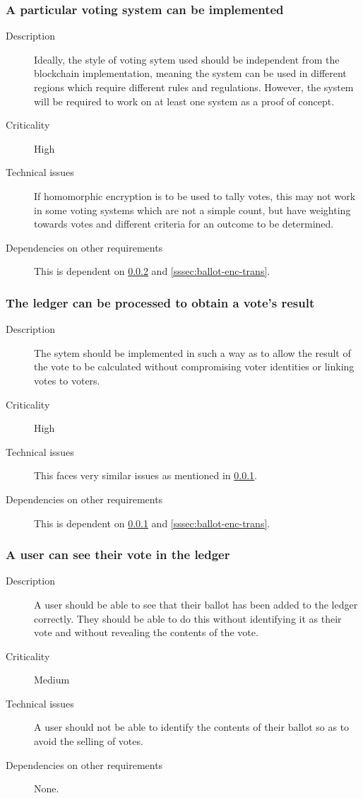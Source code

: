 \documentclass[a4paper,12pt]{article}
\begin{document}
\subsubsection{A particular voting system can be implemented}
\label{sssec:vote-sys-rep}
\begin{description}
	\item[Description]
		Ideally, the style of voting sytem used should be independent from the blockchain implementation, meaning the system can be used in different regions which require different rules and regulations. However, the system will be required to work on at least one system as a proof of concept.
	\item[Criticality]
		High
	\item[Technical issues]
		If homomorphic encryption is to be used to tally votes, this may not work in some voting systems which are not a simple count, but have weighting towards votes and different criteria for an outcome to be determined.
	\item[Dependencies on other requirements]
		This is dependent on \ref{sssec:vote-sys-calc} and \ref{sssec:ballot-enc-trans}. 
\end{description}

\subsubsection{The ledger can be processed to obtain a vote's result}
\label{sssec:vote-sys-calc}
\begin{description}
	\item[Description]
		The sytem should be implemented in such a way as to allow the result of the vote to be calculated without compromising voter identities or linking votes to voters.
	\item[Criticality]
		High
	\item[Technical issues]
		This faces very similar issues as mentioned in \ref{sssec:vote-sys-rep}.
	\item[Dependencies on other requirements]
		This is dependent on \ref{sssec:vote-sys-rep} and \ref{sssec:ballot-enc-trans}.
\end{description}

\subsubsection{A user can see their vote in the ledger}
\label{sssec:vote-sys-view}
\begin{description}
	\item[Description]
		A user should be able to see that their ballot has been added to the ledger correctly. They should be able to do this without identifying it as their vote and without revealing the contents of the vote.
	\item[Criticality]
		Medium
	\item[Technical issues]
		A user should not be able to identify the contents of their ballot so as to avoid the selling of votes.
	\item[Dependencies on other requirements]
		None.
\end{description}
\end{document}
